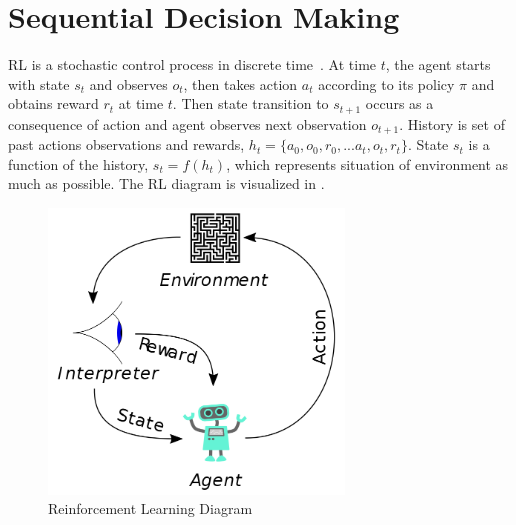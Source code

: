 \section{Sequential Decision Making}
\label{sec:decision_making}

RL is a stochastic control process in discrete time~\cite{sutton_reinforcement_1998}. 
At time $t$, the agent starts with state $s_t$ and observes $o_t$, 
then takes action $a_t$ according to its policy $\pi$ and obtains reward $r_t$ at time $t$. 
Then state transition to $s_{t+1}$ occurs as a consequence of action and agent observes next observation $o_{t+1}$. 
History is set of past actions observations and rewards, $h_t=\{ a_0, o_0, r_0, ... a_t, o_t, r_t\}$. 
State $s_t$ is a function of the history, $s_t=f(h_t)$, which represents situation of environment as much as possible. 
The RL diagram is visualized in . 
\begin{figure}
	\centering
	\includegraphics[width=0.7\textwidth]{figures/ml_theory/RL_diagram.png}
	\caption{Reinforcement Learning Diagram}
	\label{fig:rl_diagram}
\end{figure}